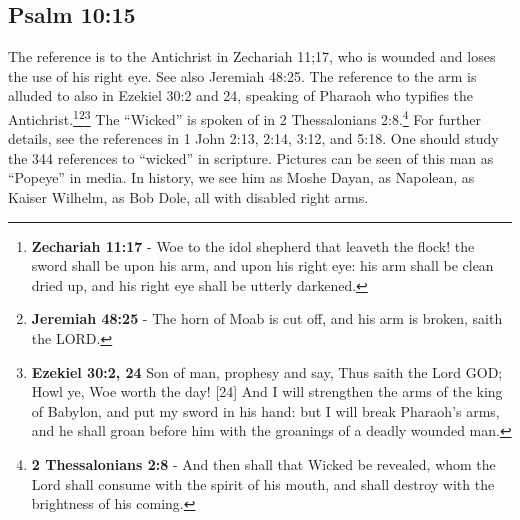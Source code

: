 \subsection{Psalm 10:15}
The reference is to the Antichrist in Zechariah 11;17, who is wounded and loses the use of his right eye. See also Jeremiah 48:25. The reference to the arm is alluded to also in Ezekiel 30:2 and 24, speaking of Pharaoh who typifies the Antichrist.\footnote{\textbf{Zechariah 11:17} -  Woe to the idol shepherd that leaveth the flock! the sword shall be upon his arm, and upon his right eye: his arm shall be clean dried up, and his right eye shall be utterly darkened.}\footnote{\textbf{Jeremiah 48:25} - The horn of Moab is cut off, and his arm is broken, saith the LORD.}\footnote{\textbf{Ezekiel 30:2, 24} Son of man, prophesy and say, Thus saith the Lord GOD; Howl ye, Woe worth the day! [24] And I will strengthen the arms of the king of Babylon, and put my sword in his hand: but I will break Pharaoh’s arms, and he shall groan before him with the groanings of a deadly wounded man.} The ``Wicked'' is spoken of in 2 Thessalonians 2:8.\footnote{\textbf{2 Thessalonians 2:8} - And then shall that Wicked be revealed, whom the Lord shall consume with the spirit of his mouth, and shall destroy with the brightness of his coming.} For further details, see the references in 1 John 2:13, 2:14, 3:12, and 5:18. One should study the 344 references to ``wicked'' in scripture. Pictures can be seen of this man as ``Popeye'' in media. In history, we see him as Moshe Dayan, as Napolean, as Kaiser Wilhelm, as Bob Dole, all with disabled right arms.\cite{Ruckman1992Psalms}


